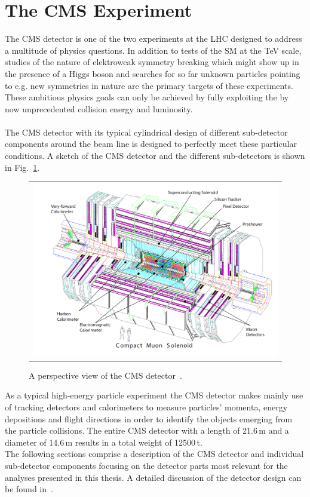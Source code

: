 \section{The CMS Experiment}
\label{sec:cms}
The CMS detector is one of the two experiments at the LHC designed to address a multitude of physics questions. In addition to tests of the SM at the TeV scale, studies of the nature of elektroweak symmetry breaking which might show up in the presence of a Higgs boson and searches for so far unknown particles pointing to e.g. new symmetries in nature are the primary targets of these experiments. These ambitious physics goals can only be achieved by fully exploiting the by now unprecedented collision energy and luminosity.\\
\\
The CMS detector with its typical cylindrical design of different sub-detector components around the beam line is designed to perfectly meet these particular conditions. A sketch of the CMS detector and the different sub-detectors is shown in Fig.~\ref{fig:CMS}.
\begin{figure}[!tp]
  \centering
  \begin{tabular}{c}
    \includegraphics[width=1.0\textwidth]{figures/Figures_Experimental_Apparatus_CMS_perspective.png}
  \end{tabular}
  \caption{A perspective view of the CMS detector~\cite{Chatrchyan:2008zzk}.}
  \label{fig:CMS}
\end{figure}
As a typical high-energy particle experiment the CMS detector makes mainly use of tracking detectors and calorimeters to measure particles' momenta, energy depositions and flight directions in order to identify the objects emerging from the particle collisions. The entire CMS detector with a length of 21.6\,m and a diameter of 14.6\,m results in a total weight of 12500\,t. \\  
The following sections comprise a description of the CMS detector and individual sub-detector components focusing on the detector parts most relevant for the analyses presented in this thesis. A detailed discussion of the detector design can be found in~\cite{Chatrchyan:2008zzk, bib:cmsptdr1}.

